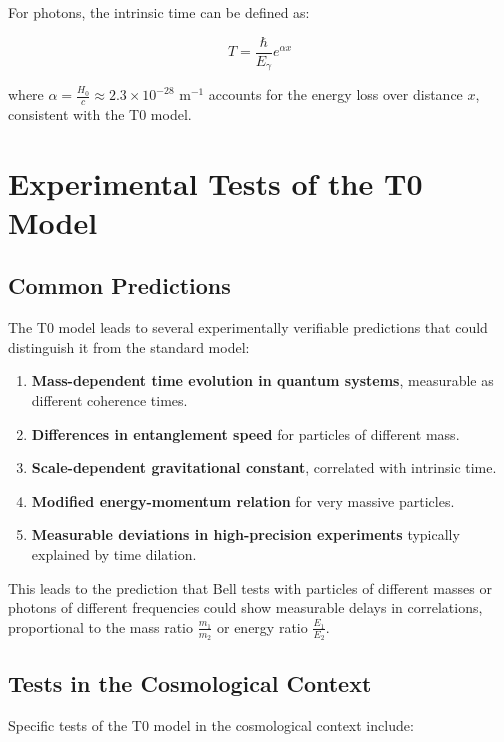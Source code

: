 \documentclass[a4paper,12pt]{article}
\begin{document}
	For photons, the intrinsic time can be defined as:
	
	\begin{equation}
		T = \frac{\hbar}{E_{\gamma}} e^{\alpha x}
	\end{equation}
	
	where $\alpha = \frac{H_0}{c} \approx 2.3 \times 10^{-28}$ m$^{-1}$ accounts for the energy loss over distance $x$, consistent with the T0 model.
	
	\section{Experimental Tests of the T0 Model}
	
	\subsection{Common Predictions}
	
	The T0 model leads to several experimentally verifiable predictions that could distinguish it from the standard model:
	
	\begin{enumerate}
		\item \textbf{Mass-dependent time evolution in quantum systems}, measurable as different coherence times.
		\item \textbf{Differences in entanglement speed} for particles of different mass.
		\item \textbf{Scale-dependent gravitational constant}, correlated with intrinsic time.
		\item \textbf{Modified energy-momentum relation} for very massive particles.
		\item \textbf{Measurable deviations in high-precision experiments} typically explained by time dilation.
	\end{enumerate}
	
	This leads to the prediction that Bell tests with particles of different masses or photons of different frequencies could show measurable delays in correlations, proportional to the mass ratio $\frac{m_1}{m_2}$ or energy ratio $\frac{E_1}{E_2}$.
	
	\subsection{Tests in the Cosmological Context}
	
	Specific tests of the T0 model in the cosmological context include:
	
\end{document}
